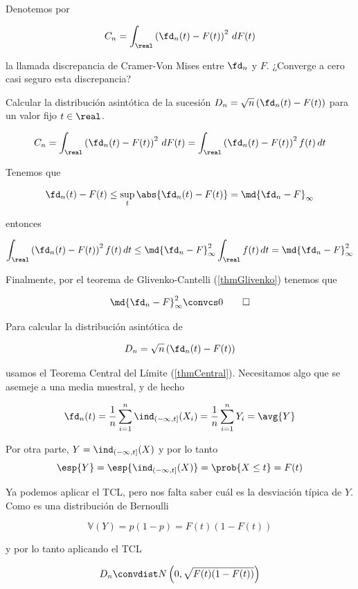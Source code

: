 \begin{problem}[4] Denotemos por 

\[ C_n = \int_\real \left(\fd_n(t) - F(t)\right)^2 \, dF(t) \]

la llamada discrepancia de Cramer-Von Mises entre $\fd_n$ y $F$. \ppart ¿Converge a cero casi seguro esta discrepancia?

\ppart Calcular la distribución asintótica de la sucesión $D_n = \sqrt{n}\left(\fd_n(t) - F(t)\right)$ para un valor fijo $t\in\real$.

\solution
\spart 
\[ C_n = \int_\real \left(\fd_n(t) - F(t)\right)^2 \, dF(t) = \int_\real \left(\fd_n(t) - F(t)\right)^2 f(t) \, dt \]

\newpage
Tenemos que 

\[ \fd_n(t) - F(t) \leq \sup_t \abs{\fd_n(t) - F(t)} = \md{\fd_n - F}_\infty \]

entonces 

\[ \int_\real \left(\fd_n(t) - F(t)\right)^2 f(t) \, dt \leq \md{\fd_n - F}_\infty^2 \int_\real f(t) \,dt = \md{\fd_n - F}_\infty^2 \]

Finalmente, por el teorema de Glivenko-Cantelli (\ref{thmGlivenko}) tenemos que 

\[ \md{\fd_n - F}_\infty^2 \convcs 0  \qed \]

\spart

Para calcular la distribución asintótica de

\[ D_n = \sqrt{n}\left(\fd_n(t) - F(t)\right) \]

usamos el Teorema Central del Límite (\ref{thmCentral}). Necesitamos algo que se asemeje a una media muestral, y de hecho

\[
\fd_n(t) =
\frac{1}{n} \sum_{i=1}^n \ind_{(-\infty, t]} (X_i) =
\frac{1}{n} \sum_{i=1}^n Y_i =
\avg{Y}
\]

Por otra parte, $Y = \ind_{(-\infty, t]}(X)$ y por lo tanto \[ \esp{Y} = \esp{\ind_{(-\infty, t]}(X)} = \prob{X \leq t} = F(t) \]

Ya podemos aplicar el TCL, pero nos falta saber cuál es la desviación típica de $Y$. Como es una distribución de Bernoulli 

\[ \mathbb{V}(Y) = p(1-p) = F(t)(1-F(t)) \]

y por lo tanto aplicando el TCL

\[ D_n \convdist N\left(0, \sqrt{F(t)(1-F(t))}\right) \]
\end{problem}

